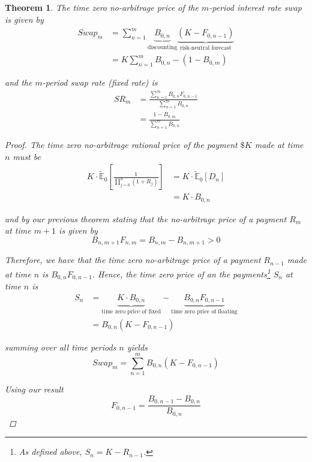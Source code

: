 \documentclass[12pt]{article}
\newtheorem{theorem}{Theorem}
\newlength\tindent
\renewcommand{\indent}{\hspace*{\tindent}}
\newcommand{\E}{\mathbb E}
\begin{document}
\begin{theorem} The time zero no-arbitrage price of the $m$-period interest rate swap is given by
\begin{align*}
	Swap_m &= \sum^m_{n = 1} \underbrace{B_{0,n}}_\text{discounting} \underbrace{ (K - F_{0,n - 1}) }_\text{risk-neutral forecast} \\
	&= K\sum^m_{n = 1} B_{0,n} - (1 - B_{0,m})
\end{align*}

and the $m$-period swap rate (fixed rate) is
\begin{align*}
	SR_m &= \frac{ \sum^m_{n = 1} B_{0,n} F_{0, n - 1} }{ \sum^m_{n = 1} B_{0,n} } \\
	&= \frac{ 1 - B_{0,m} }{ \sum^m_{n = 1} B_{0,n} }
\end{align*}

\begin{proof} The time zero no-arbitrage rational price of the payment $\$K$ made at time $n$ must be 
\begin{align*}
	K \cdot \tilde{\E}_0 \left[ \frac{1}{\prod^n_{j = 0} (1 + R_j)} \right] &= K \cdot \tilde{\E}_0 \left[ D_n \right] \\
	&= K \cdot B_{0,n}
\end{align*}

and by our previous theorem stating that the no-arbitrage price of a payment $R_m$ at time $m + 1$ is given by
\begin{equation*}
	B_{n, m + 1}F_{n,m} = B_{n,m} - B_{n, m + 1} > 0
\end{equation*}

\indent Therefore, we have that the time zero no-arbitrage price of a payment $R_{n - 1}$ made at time $n$ is $B_{0,n}F_{0, n - 1}$. Hence, the time zero price of an the payments\footnote{As defined above, $S_n = K - R_{n - 1}$.} $S_n$ at time $n$ is
\begin{align*}
	S_n &= \underbrace{K \cdot B_{0,n}}_\text{time zero price of fixed} - \underbrace{ B_{0,n}F_{0,n - 1} }_\text{time zero price of floating} \\
	&= B_{0, n}(K - F_{0, n - 1})
\end{align*}

summing over all time periods $n$ yields
\begin{equation*}
	Swap_m = \sum^m_{n = 1} B_{0,n}(K - F_{0,n - 1}) 
\end{equation*}

Using our result 
\begin{equation*}
	F_{0, n - 1} = \frac{ B_{0, n - 1} - B_{0, n} }{ B_{0, n} } 
\end{equation*}


\end{proof}
\end{theorem}
\end{document}
